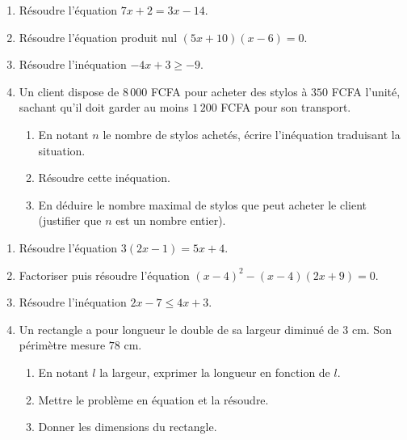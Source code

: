 \begin{enumerate}[label=\arabic*)]
\item Résoudre l'équation $7x+2=3x-14$.
\item Résoudre l'équation produit nul $(5x+10)(x-6)=0$.
\item Résoudre l'inéquation $-4x+3\ge-9$.
\item Un client dispose de $8\,000$ FCFA pour acheter des stylos à $350$ FCFA l'unité,
sachant qu'il doit garder au moins $1\,200$ FCFA pour son transport.
\begin{enumerate}[label=\alph*)]
\item En notant $n$ le nombre de stylos achetés, écrire l'inéquation traduisant la
situation.
\item Résoudre cette inéquation.
\item En déduire le nombre maximal de stylos que peut acheter le client (justifier que $n$
est un nombre entier).
\end{enumerate}
\end{enumerate}

\begin{enumerate}[label=\arabic*)]
\item Résoudre l'équation $3(2x-1)=5x+4$.
\item Factoriser puis résoudre l'équation $(x-4)^{2}-(x-4)(2x+9)=0$.
\item Résoudre l'inéquation $2x-7\le4x+3$.
\item Un rectangle a pour longueur le double de sa largeur diminué de $3$ cm. Son périmètre
mesure $78$ cm.
\begin{enumerate}[label=\alph*)]
\item En notant $l$ la largeur, exprimer la longueur en fonction de $l$.
\item Mettre le problème en équation et la résoudre.
\item Donner les dimensions du rectangle.
\end{enumerate}
\end{enumerate}

